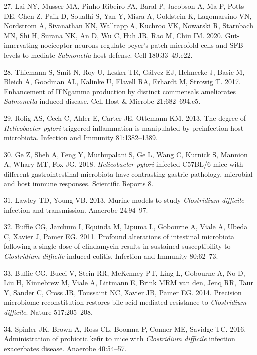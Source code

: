 \documentclass[11pt,]{article}
\begin{document}
\hypertarget{ref-Lai2020}{}
27. Lai NY, Musser MA, Pinho-Ribeiro FA, Baral P, Jacobson A, Ma P,
Potts DE, Chen Z, Paik D, Soualhi S, Yan Y, Misra A, Goldstein K,
Lagomarsino VN, Nordstrom A, Sivanathan KN, Wallrapp A, Kuchroo VK,
Nowarski R, Starnbach MN, Shi H, Surana NK, An D, Wu C, Huh JR, Rao M,
Chiu IM. 2020. Gut-innervating nociceptor neurons regulate peyer's patch
microfold cells and SFB levels to mediate \emph{Salmonella} host
defense. Cell 180:33--49.e22.

\hypertarget{ref-Thiemann2017}{}
28. Thiemann S, Smit N, Roy U, Lesker TR, Gálvez EJ, Helmecke J, Basic
M, Bleich A, Goodman AL, Kalinke U, Flavell RA, Erhardt M, Strowig T.
2017. Enhancement of IFNgamma production by distinct commensals
ameliorates \emph{Salmonella}-induced disease. Cell Host \& Microbe
21:682--694.e5.

\hypertarget{ref-Rolig2013}{}
29. Rolig AS, Cech C, Ahler E, Carter JE, Ottemann KM. 2013. The degree
of \emph{Helicobacter pylori}-triggered inflammation is manipulated by
preinfection host microbiota. Infection and Immunity 81:1382--1389.

\hypertarget{ref-Ge2018}{}
30. Ge Z, Sheh A, Feng Y, Muthupalani S, Ge L, Wang C, Kurnick S,
Mannion A, Whary MT, Fox JG. 2018. \emph{Helicobacter pylori}-infected
C57BL/6 mice with different gastrointestinal microbiota have contrasting
gastric pathology, microbial and host immune responses. Scientific
Reports 8.

\hypertarget{ref-Lawley2013}{}
31. Lawley TD, Young VB. 2013. Murine models to study \emph{Clostridium
difficile} infection and transmission. Anaerobe 24:94--97.

\hypertarget{ref-Buffie2011}{}
32. Buffie CG, Jarchum I, Equinda M, Lipuma L, Gobourne A, Viale A,
Ubeda C, Xavier J, Pamer EG. 2011. Profound alterations of intestinal
microbiota following a single dose of clindamycin results in sustained
susceptibility to \emph{Clostridium difficile}-induced colitis.
Infection and Immunity 80:62--73.

\hypertarget{ref-Buffie2014}{}
33. Buffie CG, Bucci V, Stein RR, McKenney PT, Ling L, Gobourne A, No D,
Liu H, Kinnebrew M, Viale A, Littmann E, Brink MRM van den, Jenq RR,
Taur Y, Sander C, Cross JR, Toussaint NC, Xavier JB, Pamer EG. 2014.
Precision microbiome reconstitution restores bile acid mediated
resistance to \emph{Clostridium difficile}. Nature 517:205--208.

\hypertarget{ref-Spinler2016}{}
34. Spinler JK, Brown A, Ross CL, Boonma P, Conner ME, Savidge TC. 2016.
Administration of probiotic kefir to mice with \emph{Clostridium
difficile} infection exacerbates disease. Anaerobe 40:54--57.
\end{document}

